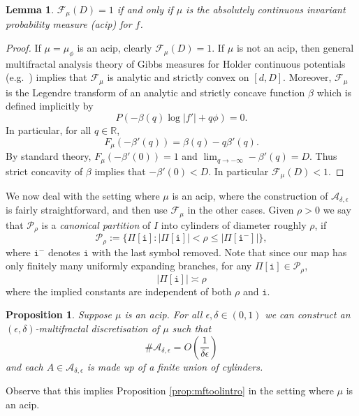 \documentclass[11pt, reqno]{amsart}
\numberwithin{equation}{section}
\theoremstyle{plain}%
\newtheorem{lma}[thm]{Lemma}
\newtheorem{prop}[thm]{Proposition}
\theoremstyle{definition}
\def\R{\ensuremath{\mathbb R}}
\def\F{\ensuremath{\mathcal F}}
\def\A{\ensuremath{\mathscr A}}
\renewcommand{\i}{\mathtt{i}}
\renewcommand{\A}{\mathcal{A}}
\renewcommand{\F}{\mathcal{F}}
\theoremstyle{nonumberplain}
\begin{document}
\begin{lma}\label{mfacip}
$\mathcal{F}_\mu(D)=1$ if and only if $\mu$ is the absolutely continuous
invariant probability measure (acip) for $f$.
\end{lma}

\begin{proof}
If $\mu=\mu_\phi$ is an acip, clearly $\mathcal{F}_\mu(D)=1$. If $\mu$ is not an acip, then general multifractal analysis theory of Gibbs measures for Holder continuous potentials (e.g.\  \cite[Theorem 6.2.1]{barreira}) implies that $\mathcal{F}_\mu$ is analytic and strictly convex on $[d,D]$. Moreover, $\mathcal{F}_\mu$ is the Legendre transform of an analytic and strictly concave function $\beta$ which is defined implicitly by
$$P(-\beta(q)\log|f'|+q\phi)=0.$$
In particular, for all $q \in \R$,
$$F_\mu(-\beta'(q))=\beta(q)-q\beta'(q).$$
By standard theory, $F_\mu(-\beta'(0))=1$ and $\lim_{q \to -\infty} -\beta'(q)=D$. Thus strict concavity of $\beta$ implies that $-\beta'(0)<D$. In particular $\mathcal{F}_\mu(D)<1$.
\end{proof}



We now deal with the setting where $\mu$ is an acip, where the construction of $\A_{\delta,\epsilon}$ is fairly straightforward, and then use $\F_\mu$ in the other cases. Given $\rho>0$ we say that $\mathscr{P}_{\rho}$ is a \emph{canonical partition} of $I$ into cylinders of diameter roughly $\rho$, if
$$\mathscr{P}_{\rho}:=\{ \Pi[\i]: |\Pi[\i]| <\rho \leq |\Pi[\i^{-}]|\},$$
where $\i^{-}$ denotes $\i$ with the last symbol removed. Note that since our map has only finitely many uniformly expanding branches, for any $\Pi[\i] \in \mathscr{P}_{\rho}$,
$$|\Pi[\i]| \asymp \rho$$
where the implied constants are independent of both $\rho$ and $\i$.

\begin{prop} Suppose $\mu$ is an acip. For all $\epsilon, \delta \in (0,1)$ we can construct an $(\epsilon,\delta)$-multifractal discretisation of $\mu$ such that
$$\# \A_{\delta,\epsilon}=O\left(\frac{1}{\delta\epsilon}\right)$$
and each $A \in\A_{\delta,\epsilon}$ is made up of a finite union of cylinders.
 \label{acipprop}
\end{prop}
 Observe that this implies Proposition \ref{prop:mftoolintro} in the setting where $\mu$ is an acip.
\end{document}
